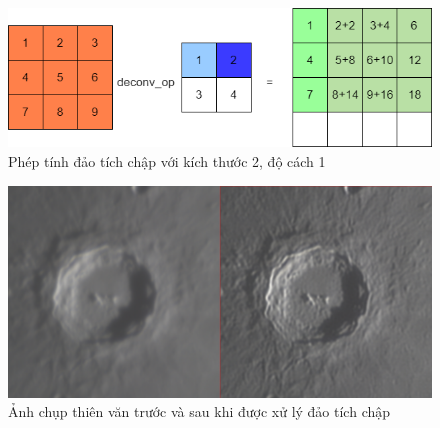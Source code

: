 \begin{figure}[h]
\centering
    \includegraphics[totalheight=3.2cm]{Images/deconv.png}
    \caption{Phép tính đảo tích chập với kích thước 2, độ cách 1}
    \label{deconvExample}
\end{figure}

\begin{figure}[h]
\centering
    \includegraphics[totalheight=3.2cm]{Images/realConvEx.png}
    \caption{Ảnh chụp thiên văn trước và sau khi được xử lý đảo tích chập}
    \label{deconvRealExample}
\end{figure}


